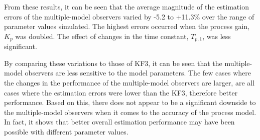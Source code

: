 From these results, it can be seen that the average magnitude of the estimation errors of the multiple-model observers varied by -5.2 to +11.3\% over the range of parameter values simulated. The highest errors occurred when the process gain, $K_p$ was doubled. The effect of changes in the time constant, $T_{p,1}$, was less significant.

By comparing these variations to those of KF3, it can be seen that the multiple-model observers are less sensitive to the model parameters. The few cases where the changes in the performance of the multiple-model observers are larger, are all cases where the estimation errors were lower than the KF3, therefore better performance. Based on this, there does not appear to be a significant downside to the multiple-model observers when it comes to the accuracy of the process model. In fact, it shows that better overall estimation performance may have been possible with different parameter values.

